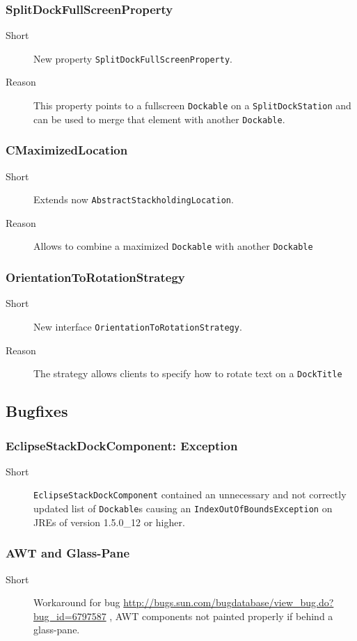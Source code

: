 \documentclass[a4paper,10pt]{article}
\newcommand{\src}[1]{\lstinline[basicstyle=\normalsize\ttfamily,keywordstyle=\normalsize\ttfamily,identifierstyle=\normalsize\ttfamily]|#1|}
\newcommand{\short}{\item[Short]}
\newcommand{\why}{\item[Reason]}
\begin{document}
\subsubsection{SplitDockFullScreenProperty}
\begin{description}
 \short New property \src{SplitDockFullScreenProperty}.
 \why This property points to a fullscreen \src{Dockable} on a \src{SplitDockStation} and can be used to merge that element with another \src{Dockable}.
\end{description}

\subsubsection{CMaximizedLocation}
\begin{description}
 \short Extends now \src{AbstractStackholdingLocation}.
 \why Allows to combine a maximized \src{Dockable} with another \src{Dockable}
\end{description}

\subsubsection{OrientationToRotationStrategy}
\begin{description}
 \short New interface \src{OrientationToRotationStrategy}.
 \why The strategy allows clients to specify how to rotate text on a \src{DockTitle}
\end{description}

\subsection{Bugfixes}
\subsubsection{EclipseStackDockComponent: Exception}
\begin{description}
 \short \src{EclipseStackDockComponent} contained an unnecessary and not correctly updated list of \src{Dockable}s causing an \src{IndexOutOfBoundsException} on JREs of version 1.5.0\_12 or higher.
\end{description}

\subsubsection{AWT and Glass-Pane}
\begin{description}
 \short Workaround for bug \url{http://bugs.sun.com/bugdatabase/view_bug.do?bug_id=6797587} , AWT components not painted properly if behind a glass-pane.
\end{description}
\end{document}

